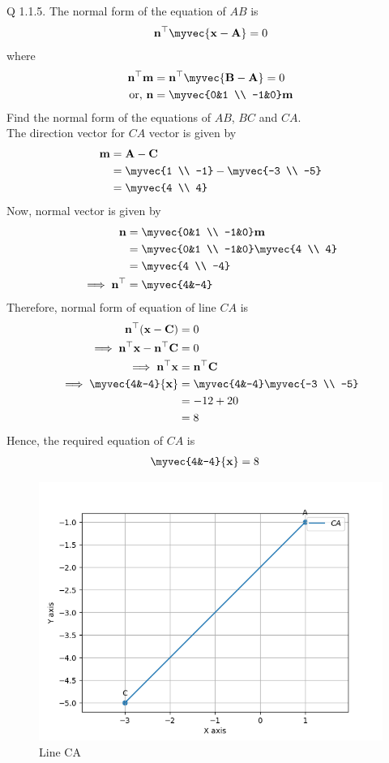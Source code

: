 \documentclass[12pt]{article}
\begin{document}
\let\vec\mathbf
Q 1.1.5. The normal form of the equation of $AB$ is
\begin{align}
\vec{n}^{\top}\myvec{\vec{x}-\vec{A}} = 0
\end{align}
where
\begin{align}
\vec{n}^{\top}\vec{m} &= \vec{n}^{\top}\myvec{\vec{B} - \vec{A}} = 0 \\
\text{or, } \vec{n} &= \myvec{0&1 \\ -1&0} \vec{m}
\end{align}
Find the normal form of the equations of $AB$, $BC$ and $CA$.\\
\solution
The direction vector for $CA$ vector is given by
\begin{align}
\vec{m} &= \vec{A} - \vec{C}\\
&= \myvec{1 \\ -1} - \myvec{-3 \\ -5}\\
&= \myvec{4 \\ 4}
\end{align}
Now, normal vector is given by
\begin{align}
\vec{n} &= \myvec{0&1 \\ -1&0}\vec{m}\\
&= \myvec{0&1 \\ -1&0}\myvec{4 \\ 4}\\
&= \myvec{4 \\ -4}\\
\implies \vec{n}^{\top} &= \myvec{4&-4}
\end{align}
Therefore, normal form of equation of line $CA$ is
\begin{align}
\vec{n}^{\top}(\vec{x} - \vec{C}) &= 0 \\
\implies \vec{n}^{\top}{\vec{x}} - \vec{n}^{\top}{\vec{C}} &= 0 \\
\implies \vec{n}^{\top}{\vec{x}} &= \vec{n}^{\top}{\vec{C}} \\
\implies \myvec{4&-4}{\vec{x}} &= \myvec{4&-4}\myvec{-3 \\ -5} \\
&= -12 + 20 \\
&= 8 
\end{align}
Hence, the required equation of $CA$ is
\begin{align}
\label{equation:CA}
\myvec{4&-4}{\vec{x}} &= 8 
\end{align}
\begin{figure}
\includegraphics[width=\columnwidth]{./figs/fig.png}
\caption{Line CA}
\label{fig: line_CA_py}
\end{figure}
\end{document}
